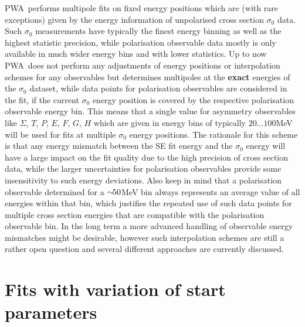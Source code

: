 \documentclass[a4paper,10pt]{article}
\def\PWA{\ttfamily PWA\rmfamily\ }
\begin{document}
\PWA performs multipole fits on fixed energy positions which are (with rare exceptions) given by the energy information of
unpolarised cross section $\sigma_0$ data. Such $\sigma_0$ measurements have typically the finest energy binning as well as
the highest statistic precision, while polarisation observable data mostly is only available in much wider energy bins and
with lower statistics.
Up to now \PWA does not perform any adjustments of energy positions or interpolation schemes for any observables
but determines multipoles at the \textbf{exact} energies of the $\sigma_0$ dataset, while data points for 
polarisation observables are considered in the fit, if the current $\sigma_0$ energy position is covered
by the respective polarisation observable energy bin. This means that a single value for asymmetry observables like
$\Sigma$, $T$, $P$, $E$, $F$, $G$, $H$ which are given in energy bins of typically $20...100$\:MeV will be used
for fits at multiple $\sigma_0$ energy positions.
The rationale for this scheme is that any energy mismatch between the SE fit energy and the $\sigma_0$ energy
will have a large impact on the fit quality due to the high precision of cross section data, while 
the larger uncertainties for polarisation observables provide some insensitivity to such energy deviations.
Also keep in mind that a polarisation observable determined for a $\sim\hspace{-0.4em}50$\:MeV bin always represents an average
value of all energies within that bin, which justifies the repeated use of such data points for multiple
cross section energies that are compatible with the polarisation observable bin.
In the long term a more advanced handling of observable energy mismatches might be desirable,
however such interpolation schemes are still a rather open question and several different approaches 
are currently discussed.

\section{Fits with variation of start parameters}
\end{document}
